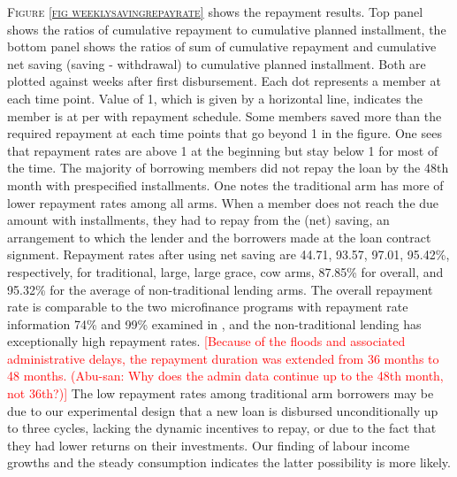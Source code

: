 	\textsc{\footnotesize Figure \ref{fig weeklysavingrepayrate}} shows the repayment results. Top panel shows the ratios of cumulative repayment to cumulative planned installment, the bottom panel shows the ratios of sum of cumulative repayment and cumulative net saving (saving - withdrawal) to cumulative planned installment. Both are plotted against weeks after first disbursement. Each dot represents a member at each time point. Value of 1, which is given by a horizontal line, indicates the member is at per with repayment schedule. Some members saved more than the required repayment at each time points that go beyond 1 in the figure. One sees that repayment rates are above 1 at the beginning but stay below 1 for most of the time. The majority of borrowing members did not repay the loan by the 48th month with prespecified installments. One notes the \textsf{traditional} arm has more of lower repayment rates among all arms. When a member does not reach the due amount with installments, they had to repay from the (net) saving, an arrangement to which the lender and the borrowers made at the loan contract signment. Repayment rates after using net saving are 44.71, 93.57, 97.01, 95.42\%, respectively, for \textsf{traditional, large, large grace, cow} arms, 87.85\% for overall, and 95.32\% for the average of non-\textsf{traditional} lending arms. %
	The overall repayment rate is comparable to the two microfinance programs with repayment rate information 74\% and 99\% examined in \citet{BanerjeeKarlanZinman2015}, and the non-\textsf{traditional} lending has exceptionally high repayment rates. \textcolor{red}{[Because of the floods and associated administrative delays, the repayment duration was extended from 36 months to 48 months. (Abu-san: Why does the admin data continue up to the 48th month, not 36th?)]} The low repayment rates among \textsf{traditional} arm borrowers may be due to our experimental design that a new loan is disbursed unconditionally up to three cycles, lacking the dynamic incentives to repay, or due to the fact that they had lower returns on their investments. Our finding of labour income growths and the steady consumption indicates the latter possibility is more likely. 


